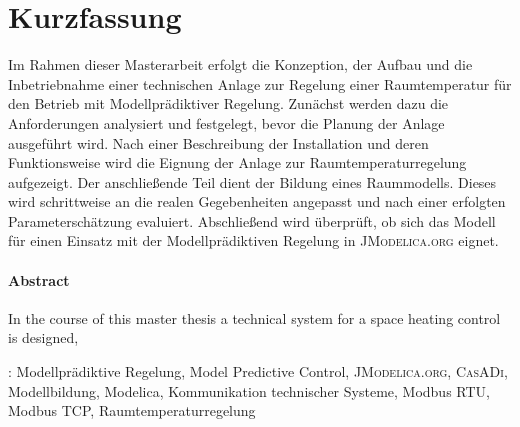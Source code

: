 %
%

\chapter*{Kurzfassung}
\thispagestyle{empty}
Im Rahmen dieser Masterarbeit erfolgt die Konzeption, der Aufbau und die Inbetriebnahme einer technischen Anlage zur Regelung einer Raumtemperatur für den Betrieb mit Modellprädiktiver Regelung. Zunächst werden dazu die Anforderungen analysiert und festgelegt, bevor die Planung der Anlage ausgeführt wird. Nach einer Beschreibung der Installation und deren Funktionsweise wird die Eignung der Anlage zur Raumtemperaturregelung aufgezeigt. Der anschließende Teil dient der Bildung eines Raummodells. Dieses wird schrittweise an die realen Gegebenheiten angepasst und nach einer erfolgten Parameterschätzung evaluiert. Abschließend wird überprüft, ob sich das Modell für einen Einsatz mit der Modellprädiktiven Regelung in \textsc{JModelica.org} eignet.

\subsubsection*{Abstract}
In the course of this master thesis a technical system for a space heating control is designed, 
\vspace{8\baselineskip}

{\normalsize
{}:  Modellprädiktive Regelung, Model Predictive Control, \textsc{JModelica.org}, \textsc{CasADi}, Modellbildung, Modelica, Kommunikation technischer Systeme, Modbus RTU, Modbus TCP, Raumtemperaturregelung
}


